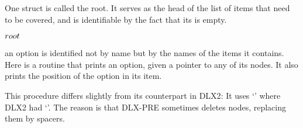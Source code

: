 One  struct is called the root. It serves as the head of the
list of items that need to be covered, and is identifiable by the fact
that its  is empty.

\Y\B\4\D$\\{root}$ \5
\par
\fi

an option is identified not by name but by the names of the items it
contains.
Here is a routine that prints an option, given a pointer to any of its
nodes. It also prints the position of the option in its item.

This procedure differs slightly from its counterpart in {\mc DLX2}: It
uses `' where {\mc DLX2} had `'. The reason is that
{\mc DLX-PRE} sometimes deletes nodes, replacing them by spacers.

